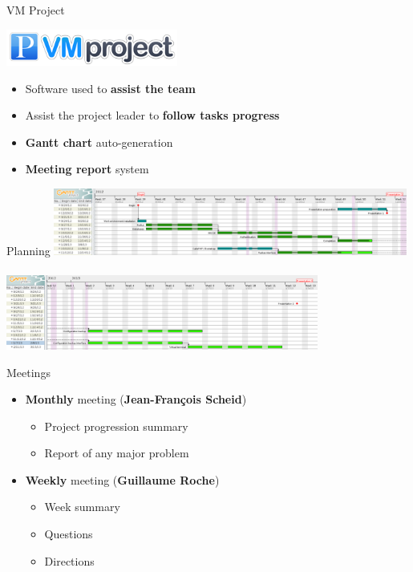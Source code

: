 \documentclass[12pt]{beamer}
\begin{document}
\begin{frame}{VM Project}
    \begin{center}
    \includegraphics[width=160pt]{img/vmproject_logo.png}
    \end{center}
    \begin{itemize}[<+->]
	\item Software used to \textbf{assist the team}
    	\vfill
    	\item Assist the project leader to \textbf{follow tasks progress}
    	\vfill
    	\item \textbf{Gantt chart} auto-generation
    	\vfill
    	\item \textbf{Meeting report} system
    \end{itemize}
\end{frame}

\begin{frame}{Planning}
	\includegraphics[width=330pt]{img/gantt_en_part1.pdf}\\
~\\
	\includegraphics[height=70pt]{img/gantt_en_part2.pdf}
\end{frame}

\begin{frame}{Meetings}
\begin{itemize}
    \item \textbf{Monthly} meeting (\textbf{Jean-François Scheid})
	\vspace{0.2cm}
	\begin{itemize}
	\item Project progression summary
	\item Report of any major problem
	\end{itemize}
	\vspace{0.8cm}\pause
    \item \textbf{Weekly} meeting (\textbf{Guillaume Roche})
	\vspace{0.2cm}
	\begin{itemize}
	\item Week summary
	\item Questions
	\item Directions
	\end{itemize}
    \end{itemize}
\end{frame}
\end{document}
